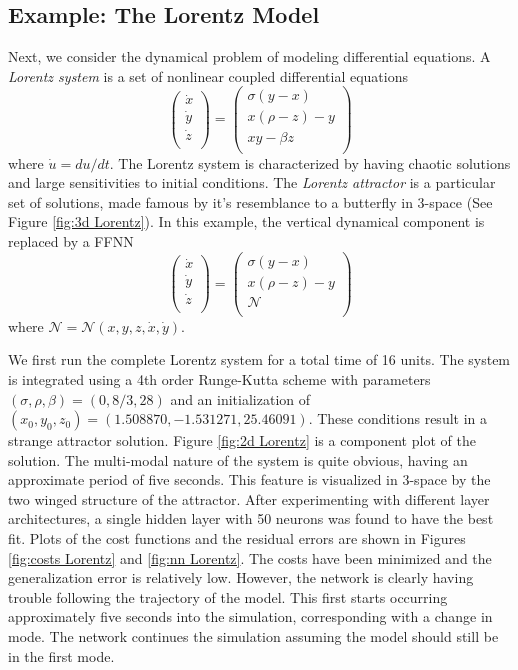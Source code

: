 \subsection{Example: The Lorentz Model}
Next, we consider the dynamical problem of modeling differential equations. A \textit{Lorentz system} is a set of nonlinear coupled differential equations
\begin{equation}
\begin{pmatrix} 
\dot{x} \\
\dot{y} \\
\dot{z} \\
\end{pmatrix} 
=
\begin{pmatrix} 
\sigma (y - x) \\
x (\rho - z) - y \\
xy - \beta z \\
\end{pmatrix} 
\end{equation}
where $\dot{u} = du/ dt$. The Lorentz system is characterized by having chaotic solutions and large sensitivities to initial conditions. The \textit{Lorentz attractor} is a particular set of solutions, made famous by it's resemblance to a butterfly in 3-space (See Figure \ref{fig:3d Lorentz}). In this example, the vertical dynamical component is replaced by a FFNN
\begin{equation}
\begin{pmatrix} 
\dot{x} \\
\dot{y} \\
\dot{z} \\
\end{pmatrix} 
=
\begin{pmatrix} 
\sigma (y - x) \\
x (\rho - z) - y \\
\mathcal{N} \\
\end{pmatrix}
\end{equation}
where $\mathcal{N}=\mathcal{N}(x, y, z, \dot{x}, \dot{y})$. 

We first run the complete Lorentz system for a total time of 16 units. The system is integrated using a 4th order Runge-Kutta scheme with parameters $(\sigma, \rho, \beta)=(0, 8/3, 28)$ and an initialization of $(x_0, y_0, z_0)=(1.508870, -1.531271, 25.46091)$. These conditions result in a strange attractor solution. Figure \ref{fig:2d Lorentz} is a component plot of the solution. The multi-modal nature of the system is quite obvious, having an approximate period of five seconds. This feature is visualized in 3-space by the two winged structure of the attractor. After experimenting with different layer architectures, a single hidden layer with 50 neurons was found to have the best fit. Plots of the cost functions and the residual errors are shown in Figures \ref{fig:costs Lorentz} and \ref{fig:nn Lorentz}. The costs have been minimized and the generalization error is relatively low. However, the network is clearly having trouble following the trajectory of the model. This first starts occurring approximately five seconds into the simulation, corresponding with a change in mode. The network continues the simulation assuming the model should still be in the first mode. 

